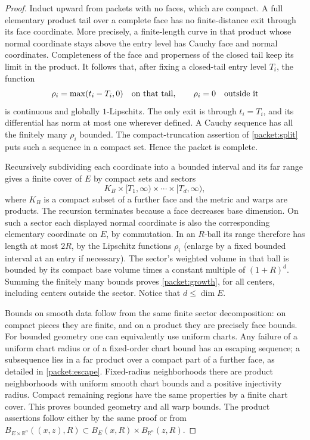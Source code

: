 \documentclass[11pt]{article}
\numberwithin{equation}{section}
\theoremstyle{definition}
\theoremstyle{remark}
\begin{document}
\begin{proof}
Induct upward from packets with no faces, which are compact.
A full elementary product tail over a complete face has no finite-distance
exit through its face coordinate.  More precisely, a finite-length
curve in that product whose normal coordinate stays above the entry
level has Cauchy face and normal coordinates.  Completeness of the face
and properness of the closed tail keep its limit in the product.
It follows that, after fixing a closed-tail entry level $T_i$, the
function
\[
 \rho_i=\max(t_i-T_i,0)\quad\hbox{on that tail},\qquad
 \rho_i=0\quad\hbox{outside it}
\]
is continuous and globally $1$-Lipschitz.  The only exit is through
$t_i=T_i$, and its differential has norm at most one wherever defined.
A Cauchy sequence has all the finitely many $\rho_i$ bounded.
The compact-truncation assertion of \cref{packet:split} puts such a
sequence in a compact set.  Hence the packet is complete.

Recursively subdividing each coordinate into a bounded interval and
its far range gives a finite cover of $E$ by compact sets and sectors
\begin{equation}\label{packet:sector}
 K_B\times[T_1,\infty)\times\cdots\times[T_d,\infty),
\end{equation}
where $K_B$ is a compact subset of a further face and the metric and
warps are products.  The recursion terminates because a face decreases
base dimension.  On such a sector each displayed normal coordinate is
also the corresponding elementary coordinate on $E$, by commutation.
In an $R$-ball its range therefore has length at most $2R$, by the
Lipschitz functions $\rho_i$ (enlarge by a fixed bounded interval at
an entry if necessary).  The sector's weighted volume in that ball
is bounded by its compact base volume times a constant multiple of
$(1+R)^d$.  Summing the finitely many bounds proves
\cref{packet:growth}, for all centers, including centers outside the
sector.  Notice that $d\le\dim E$.

Bounds on smooth data follow from the same finite sector decomposition:
on compact pieces they are finite, and on a product they are precisely
face bounds.  For bounded geometry one can equivalently use uniform
charts.  Any failure of a uniform chart radius or of a fixed-order
chart bound has an escaping sequence; a subsequence lies in a far
product over a compact part of a further face, as detailed in
\cref{packet:escape}.  Fixed-radius neighborhoods there are product
neighborhoods with uniform smooth chart bounds and a positive
injectivity radius.  Compact remaining regions have the same
properties by a finite chart cover.  This proves bounded geometry
and all warp bounds.  The product assertions follow either by the
same proof or from
$B_{E\times\mathbb R^a}((x,z),R)\subset B_E(x,R)\times B_{\mathbb R^a}(z,R)$.
\end{proof}
\end{document}
